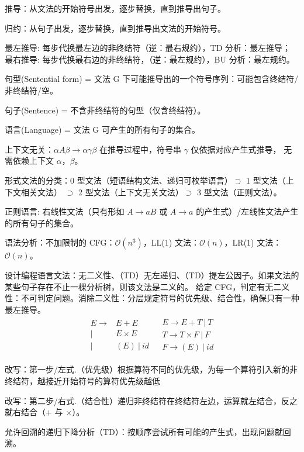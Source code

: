 \par \noindent 推导：从文法的开始符号出发，逐步替换，直到推导出句子。
\par \noindent 归约：从句子出发，逐步替换，直到推导出文法的开始符号。
\par \noindent 最左推导: 每步代换最左边的非终结符（逆：最右规约），TD 分析：最左推导；
最右推导: 每步代换最右边的非终结符，（逆：最左规约），BU 分析：最左规约。
\par \noindent 句型(Sentential form) = 文法 G 下可能推导出的一个符号序列：可能包含终结符/非终结符/空。
\par \noindent 句子(Sentence) = 不含非终结符的句型（仅含终结符）。
\par \noindent 语言(Language) = 文法 G 可产生的所有句子的集合。
\par \noindent 上下文无关：$\alpha A \beta \rightarrow \alpha \gamma \beta$ 在推导过程中，符号串 $\gamma$ 仅依据对应产生式推导，
无需依赖上下文 $\alpha$，$\beta$。
\par \noindent 形式文法的分类：0 型文法（短语结构文法、递归可枚举语言）$\supset$ 1 型文法（上下文相关文法）
$\supset$ 2 型文法（上下文无关文法）$\supset$ 3 型文法（正则文法）。
\par \noindent 正则语言: 右线性文法（只有形如 $A \rightarrow a B$ 或 $A \rightarrow a$ 的产生式）/左线性文法产生的所有句子的集合。
\par \noindent 语法分析：不加限制的 CFG：$\mathcal{O}(n^3)$，LL(1) 文法：$\mathcal{O}(n)$，LR(1) 文法：$\mathcal{O}(n)$。
\par \noindent 设计编程语言文法：无二义性、（TD）无左递归、（TD）提左公因子。如果文法的某些句子存在不止一棵分析树，则该文法是二义的。
给定 CFG，判定有无二义性：不可判定问题。消除二义性：分层规定符号的优先级、结合性，确保只有一种最左推导。
\vspace{-10pt}
$$
\begin{array}{cc}
    \begin{array}{rl}
        E \rightarrow & E + E \\
        | & E \times E  \\
        | & (E)\ |\ id
    \end{array} &
    \begin{array}{l}
        E \rightarrow E + T\ |\ T \\
        T \rightarrow T \times F\ |\ F \\
        F \rightarrow (E)\ |\ id
    \end{array}
\end{array}
$$
\vspace{-15pt}
\par \noindent 改写：第一步/左式.（优先级）根据算符不同的优先级，为每一个算符引入新的非终结符，越接近开始符号的算符优先级越低
\par \noindent 改写：第二步/右式.（结合性）递归非终结符在终结符左边，运算就左结合，反之就右结合（$+$ 与 $\times$）。
\par \noindent 允许回溯的递归下降分析（TD）：按顺序尝试所有可能的产生式，出现问题就回溯。
